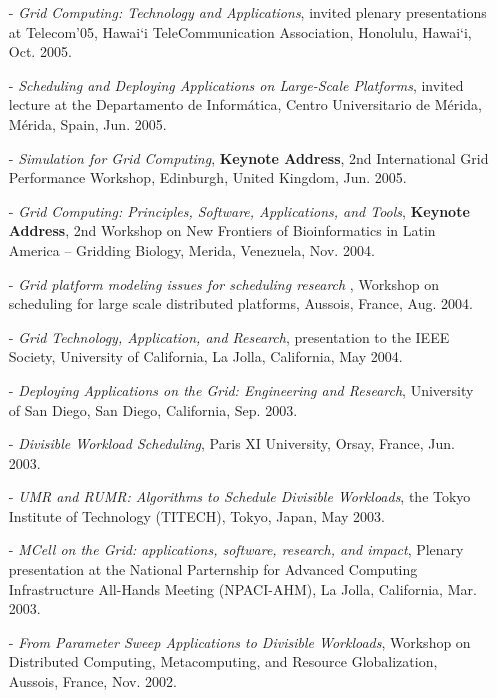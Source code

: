 \documentclass[times,11pt]{letter}
\begin{document}
\begin{itemize}
\item [-] {\it Grid Computing: Technology and Applications}, invited
plenary presentations at Telecom'05, Hawai`i TeleCommunication Association,
Honolulu, Hawai`i, Oct. 2005.

\item [-] {\it Scheduling and Deploying Applications on Large-Scale
Platforms}, invited lecture at the Departamento de Inform\'atica, Centro
Universitario de M\'erida, M\'erida, Spain, Jun. 2005.

\item [-] {\it Simulation for Grid Computing}, {\bf Keynote Address},
2nd International Grid Performance Workshop, Edinburgh, United Kingdom,
Jun. 2005.

\item [-] {\it Grid Computing: Principles, Software, Applications, and Tools},
{\bf Keynote Address}, 2nd Workshop on New Frontiers of Bioinformatics in Latin America -- Gridding
Biology, Merida, Venezuela, Nov. 2004.

\item [-] {\it Grid platform modeling issues for scheduling research },
Workshop on scheduling for large scale distributed platforms, Aussois,
France, Aug. 2004.

\item [-] {\it Grid Technology, Application, and Research}, presentation 
to the IEEE Society, University of California, La Jolla, California, May 2004.

\item [-] {\it Deploying Applications on the Grid: Engineering and
Research}, University of San Diego, San Diego, California, Sep. 2003.

\item [-] {\it Divisible Workload Scheduling}, Paris XI University,
Orsay, France, Jun. 2003.

\item [-] {\it UMR and RUMR: Algorithms to Schedule Divisible Workloads},
the Tokyo Institute of Technology (TITECH), Tokyo, Japan, 
May 2003.

\item[-] {\it MCell on the Grid: applications, software, research,
and impact}, Plenary presentation at the National Parternship for Advanced
Computing Infrastructure All-Hands Meeting (NPACI-AHM), La Jolla,
California, Mar. 2003.


\item[-] {\it From Parameter Sweep Applications to Divisible Workloads},
Workshop on Distributed Computing, Metacomputing, and Resource
Globalization, Aussois, France, Nov. 2002.


\end{itemize}
\end{document}
